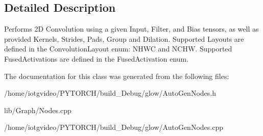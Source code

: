 \subsection{Detailed Description}
Performs 2D Convolution using a given Input, Filter, and Bias tensors, as well as provided Kernels, Strides, Pads, Group and Dilation. Supported Layouts are defined in the Convolution\+Layout enum\+: N\+H\+WC and N\+C\+HW. Supported Fused\+Activations are defined in the Fused\+Activation enum. 

The documentation for this class was generated from the following files\+:\begin{DoxyCompactItemize}
\item 
/home/iotgvideo/\+P\+Y\+T\+O\+R\+C\+H/build\+\_\+\+Debug/glow/Auto\+Gen\+Nodes.\+h\item 
lib/\+Graph/Nodes.\+cpp\item 
/home/iotgvideo/\+P\+Y\+T\+O\+R\+C\+H/build\+\_\+\+Debug/glow/Auto\+Gen\+Nodes.\+cpp\end{DoxyCompactItemize}
